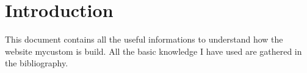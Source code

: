 \section{Introduction}

This document contains all the useful informations to understand how the website mycustom is build. All the basic knowledge I have used are gathered in the bibliography.